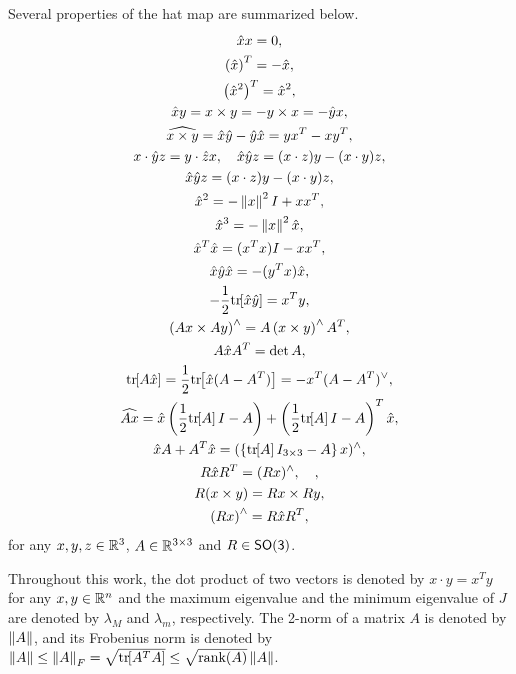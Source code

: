 Several properties of the hat map are summarized below.
\begin{gather}
    \hat{x} x = 0, \\
    \left( \hat x \right) ^T = - \hat x, \\
    \left( \hat{x}^2 \right)^T = \hat x ^2, \\
    \hat x y = x\times y = - y\times x = - \hat y x, \label{eqn:cross_product}\\
    \widehat{x\times y} = \hat x \hat y -\hat y \hat x = yx^T-xy^T,\label{eqn:hatxy}\\
    x\cdot \hat y z = y\cdot \hat z x,\quad \hat x\hat y z = (x\cdot z) y - (x\cdot y ) z\label{eqn:STP},\\
    \hat x\hat y z = (x\cdot z) y - (x\cdot y ) z,\label{eqn:VTP}\\
    \hat{x}^2 = - \left\| x \right\|^2 I + x x^T, \\
    \hat{x}^3 = -\left\| x \right\|^2 \hat x, \\
    \hat x^T \hat x = (x^T x) I - x x^T, \label{eq:xTx} \\
    \hat x \hat y \hat x=-(y^Tx)\hat x,\\
    -\frac{1}{2}\mathrm{tr}\negthickspace\left[ \hat x \hat y \right] = x^T y,\\
    \left( A x \times A y \right)^\wedge = A\left( x \times y \right)^\wedge A^T, \\
    A \hat x A^T = \det{A}, \\
    \mathrm{tr}\negthickspace\left[ A\hat x  \right]=\frac{1}{2}\mathrm{tr}\negthickspace\left[ \hat x (A-A^T) \right]=-x^T (A-A^T)^\vee,\label{eqn:hat1}\\
    \widehat{Ax} = \hat x \left( \frac{1}{2}\mathrm{tr}\negthickspace\left[ A \right]I-A \right) + \left( \frac{1}{2}\mathrm{tr}\negthickspace\left[ A \right]I-A \right)^T \hat x,\\
    \hat x  A+A^T\hat x=(\left\{ \mathrm{tr}\negthickspace\left[ A \right]I_{3\times 3}-A \right\}x)^{\wedge}, \label{eqn:xAAx} \\
    R\hat x R^T = (Rx)^\wedge,\quad , \\
    R(x\times y) = Rx\times Ry\label{eqn:RxR} , \\
    \left( R x \right)^\wedge = R \hat x R^T, \\
\end{gather}
for any $x,y,z\in\mathbb{R}^{3}$, $A\in\mathbb{R}^{3\times 3}$ and $R\in\mathsf{SO(3)}$. 

Throughout this work, the dot product of two vectors is denoted by $x\cdot y = x^T y$ for any $x,y\in\mathbb{R}^n$ and the maximum eigenvalue and the minimum eigenvalue of $J$ are denoted by $\lambda_M$ and $\lambda_m$, respectively. 
The 2-norm of a matrix \( A \) is denoted by \( \left\| A \right\| \), and its Frobenius norm is denoted by \( \left\| A \right\| \leq \left\| A \right\|_F = \sqrt{\mathrm{tr}\negthickspace\left[ A^T A \right]} \leq \sqrt{\text{rank}(A)} \left\| A \right\| \).

